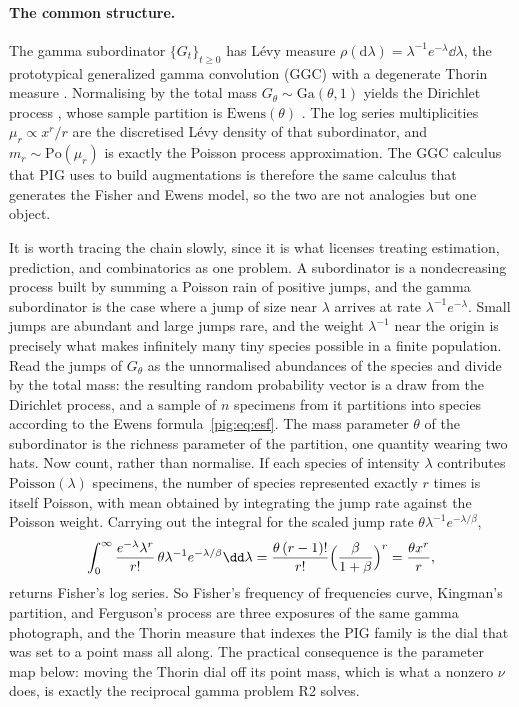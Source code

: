 \paragraph{The common structure.} The gamma subordinator $\{G_t\}_{t\ge0}$ has L\'evy measure $\rho(\mathrm{d}\lambda)=\lambda^{-1}e^{-\lambda}\dd\lambda$, the prototypical generalized gamma convolution (GGC) with a degenerate Thorin measure \citep{pig:bondesson1992}. Normalising by the total mass $G_\theta\sim\mathrm{Ga}(\theta,1)$ yields the Dirichlet process \citep{pig:ferguson1973}, whose sample partition is $\mathrm{Ewens}(\theta)$ \citep{pig:kingman1978}. The log series multiplicities $\mu_r\propto x^r/r$ are the discretised L\'evy density of that subordinator, and $m_r\sim\mathrm{Po}(\mu_r)$ is exactly the \citet{pig:arratia1992} Poisson process approximation. The GGC calculus that PIG uses to build augmentations \citep[Remark 4]{pig:he2022} is therefore the same calculus that generates the Fisher and Ewens model, so the two are not analogies but one object.

It is worth tracing the chain slowly, since it is what licenses treating estimation, prediction, and combinatorics as one problem. A subordinator is a nondecreasing process built by summing a Poisson rain of positive jumps, and the gamma subordinator is the case where a jump of size near $\lambda$ arrives at rate $\lambda^{-1}e^{-\lambda}$. Small jumps are abundant and large jumps rare, and the weight $\lambda^{-1}$ near the origin is precisely what makes infinitely many tiny species possible in a finite population. Read the jumps of $G_\theta$ as the unnormalised abundances of the species and divide by the total mass: the resulting random probability vector is a draw from the Dirichlet process, and a sample of $n$ specimens from it partitions into species according to the Ewens formula~\eqref{pig:eq:esf}. The mass parameter $\theta$ of the subordinator is the richness parameter of the partition, one quantity wearing two hats. Now count, rather than normalise. If each species of intensity $\lambda$ contributes $\mathrm{Poisson}(\lambda)$ specimens, the number of species represented exactly $r$ times is itself Poisson, with mean obtained by integrating the jump rate against the Poisson weight. Carrying out the integral for the scaled jump rate $\theta\lambda^{-1}e^{-\lambda/\beta}$,
\[
\int_0^\infty\frac{e^{-\lambda}\lambda^r}{r!}\,\theta\lambda^{-1}e^{-\lambda/\beta}\dd\lambda=\frac{\theta\,(r-1)!}{r!}\Bigl(\frac{\beta}{1+\beta}\Bigr)^{r}=\frac{\theta x^r}{r},
\]
returns Fisher's log series. So Fisher's frequency of frequencies curve, Kingman's partition, and Ferguson's process are three exposures of the same gamma photograph, and the Thorin measure that indexes the PIG family is the dial that was set to a point mass all along. The practical consequence is the parameter map below: moving the Thorin dial off its point mass, which is what a nonzero $\nu$ does, is exactly the reciprocal gamma problem R2 solves.

